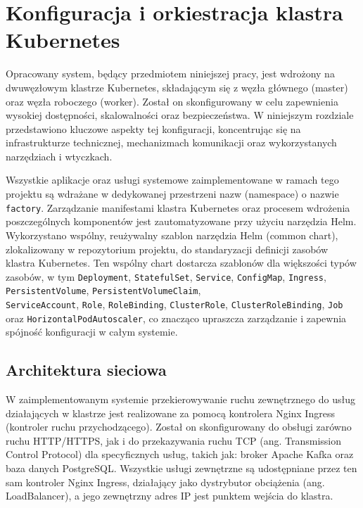 \section{Konfiguracja i orkiestracja klastra Kubernetes}
\label{chap:konfiguracja_kubernetes}

Opracowany system, będący przedmiotem niniejszej pracy, jest wdrożony na dwuwęzłowym klastrze Kubernetes, składającym się z węzła głównego (master) oraz węzła roboczego (worker). Został on skonfigurowany w celu zapewnienia wysokiej dostępności, skalowalności oraz bezpieczeństwa. W niniejszym rozdziale przedstawiono kluczowe aspekty tej konfiguracji, koncentrując się na infrastrukturze technicznej, mechanizmach komunikacji oraz wykorzystanych narzędziach i wtyczkach.

Wszystkie aplikacje oraz usługi systemowe zaimplementowane w ramach tego projektu są wdrażane w dedykowanej przestrzeni nazw (namespace) o nazwie \texttt{factory}. Zarządzanie manifestami klastra Kubernetes oraz procesem wdrożenia poszczególnych komponentów jest zautomatyzowane przy użyciu narzędzia Helm. Wykorzystano wspólny, reużywalny szablon narzędzia Helm (common chart), zlokalizowany w repozytorium projektu, do standaryzacji definicji zasobów klastra Kubernetes. Ten wspólny chart dostarcza szablonów dla większości typów zasobów, w tym \texttt{Deployment}, \texttt{StatefulSet}, \texttt{Service}, \texttt{ConfigMap}, \texttt{Ingress}, \texttt{PersistentVolume}, \texttt{PersistentVolumeClaim}, \\ \texttt{ServiceAccount}, \texttt{Role}, \texttt{RoleBinding}, \texttt{ClusterRole},  \texttt{ClusterRoleBinding}, \texttt{Job} \\ oraz \texttt{HorizontalPodAutoscaler}, co znacząco upraszcza zarządzanie i zapewnia spójność konfiguracji w całym systemie.

\subsection{Architektura sieciowa}

W zaimplementowanym systemie przekierowywanie ruchu zewnętrznego do usług działających w klastrze jest realizowane za pomocą kontrolera Nginx Ingress (kontroler ruchu przychodzącego). Został on skonfigurowany do obsługi zarówno ruchu HTTP/HTTPS, jak i do przekazywania ruchu TCP (ang. Transmission Control Protocol) \cite{tanenbaum2011computer} dla specyficznych usług, takich jak: broker Apache Kafka oraz baza danych PostgreSQL. Wszystkie usługi zewnętrzne są udostępniane przez ten sam kontroler Nginx Ingress, działający jako dystrybutor obciążenia (ang. LoadBalancer), a jego zewnętrzny adres IP jest punktem wejścia do klastra.

